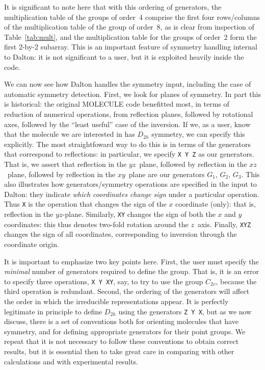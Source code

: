 It is significant to note here that with this ordering of generators,
the multiplication table of the groups of order~4 comprise the first
four rows/columns of the multiplication table of the group of order~8,
as is clear from inspection of Table~\ref{tab:mult},
and the multiplication table for the groups of order~2 form the first
2-by-2 subarray.  This is an important feature of symmetry handling
internal to Dalton: it is not significant to a user, but it is
exploited heavily inside the code.

We can now see how Dalton handles the symmetry input, including the
case of automatic symmetry detection.  First, we look for planes of
symmetry.  In part this is historical: the original MOLECULE code
benefitted most, in terms of reduction of numerical operations, from
reflection planes, followed by rotational axes, followed by the
``least useful'' case of the inversion.  If we, as a user, know that
the molecule we are interested in has $D_{2h}$ symmetry, we can
specify this explicitly.  The most straightfoward way to do this is in
terms of the generators that correspond to reflections: in particular,
we specify \verb|X Y Z| as our generators.  That is, we assert that
reflection in the $yz$~plane, followed by reflection in the
$xz$~plane, followed by reflection in the $xy$~plane are our
generators $G_1$, $G_2$, $G_3$.  This also illustrates how
generators/symmetry operations are specified in the input to Dalton:
they indicate \emph{which coordinates change sign} under a particular
operation.  Thus \verb|X| is the operation that changes the sign of
the $x$ coordinate (only): that is, reflection in the $yz$-plane.
Similarly, \verb|XY| changes the sign of both the $x$ and $y$
coordinates: this thus denotes two-fold rotation around the $z$~axis.  Finally,
\verb|XYZ| changes the sign of all coordinates, corresponding to
inversion through the coordinate origin.

It is important to emphasize two key points here.  First, the user
must specify the \emph{minimal} number of generators required to
define the group.  That is, it is an error to specify three
operations, \verb|X Y XY|, say, to try to use the group $C_{2v}$,
because the third operation is redundant.  Second, the ordering of the
generators will affect the order in which the irreducible
representations appear.  It is perfectly legitimate in principle to
define $D_{2h}$ using the generators \verb|Z Y X|, but as we now
discuss, there is a set of conventions both for orienting molecules
that have symmetry, and for defining appropriate generators for their
point groups.  We repeat that it is not necessary to follow these
conventions to obtain correct results, but it is essential then to
take great care in comparing with other calculations and with
experimental results.

